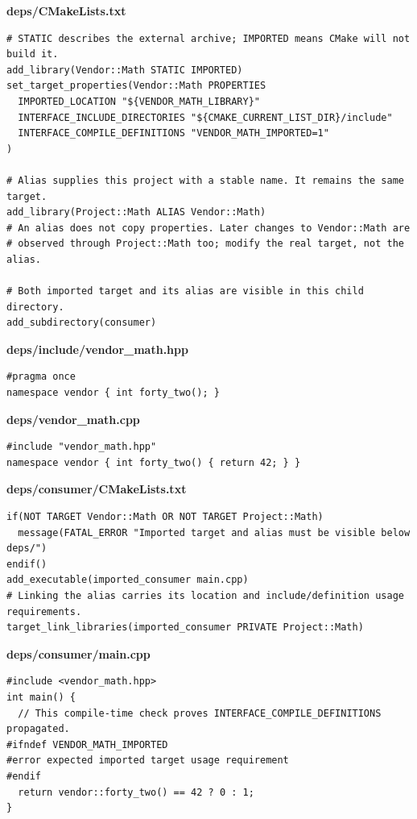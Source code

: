 \textbf{deps/CMakeLists.txt}

\begin{verbatim}
# STATIC describes the external archive; IMPORTED means CMake will not build it.
add_library(Vendor::Math STATIC IMPORTED)
set_target_properties(Vendor::Math PROPERTIES
  IMPORTED_LOCATION "${VENDOR_MATH_LIBRARY}"
  INTERFACE_INCLUDE_DIRECTORIES "${CMAKE_CURRENT_LIST_DIR}/include"
  INTERFACE_COMPILE_DEFINITIONS "VENDOR_MATH_IMPORTED=1"
)

# Alias supplies this project with a stable name. It remains the same target.
add_library(Project::Math ALIAS Vendor::Math)
# An alias does not copy properties. Later changes to Vendor::Math are
# observed through Project::Math too; modify the real target, not the alias.

# Both imported target and its alias are visible in this child directory.
add_subdirectory(consumer)
\end{verbatim}

\textbf{deps/include/vendor\_math.hpp}

\begin{verbatim}
#pragma once
namespace vendor { int forty_two(); }
\end{verbatim}

\textbf{deps/vendor\_math.cpp}

\begin{verbatim}
#include "vendor_math.hpp"
namespace vendor { int forty_two() { return 42; } }
\end{verbatim}

\textbf{deps/consumer/CMakeLists.txt}

\begin{verbatim}
if(NOT TARGET Vendor::Math OR NOT TARGET Project::Math)
  message(FATAL_ERROR "Imported target and alias must be visible below deps/")
endif()
add_executable(imported_consumer main.cpp)
# Linking the alias carries its location and include/definition usage requirements.
target_link_libraries(imported_consumer PRIVATE Project::Math)
\end{verbatim}

\textbf{deps/consumer/main.cpp}

\begin{verbatim}
#include <vendor_math.hpp>
int main() {
  // This compile-time check proves INTERFACE_COMPILE_DEFINITIONS propagated.
#ifndef VENDOR_MATH_IMPORTED
#error expected imported target usage requirement
#endif
  return vendor::forty_two() == 42 ? 0 : 1;
}
\end{verbatim}

